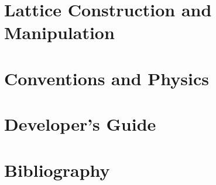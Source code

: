 \documentclass{book}
\begin{document}



\cleardoublepage
{} 
{}
\tableofcontents

\cleardoublepage
{} 
{} 
\listoffigures

\cleardoublepage
{} 
{} 
\listoftables

\setlength{\parskip}{\dPar}
\setlength{\parindent}{0ex}

\part{Lattice Construction and Manipulation}











\part{Conventions and Physics}




\part{Developer's Guide}





\part{Bibliography}

\printbibliography[heading=bibnumbered]

\cleardoublepage
{}
\end{document}
